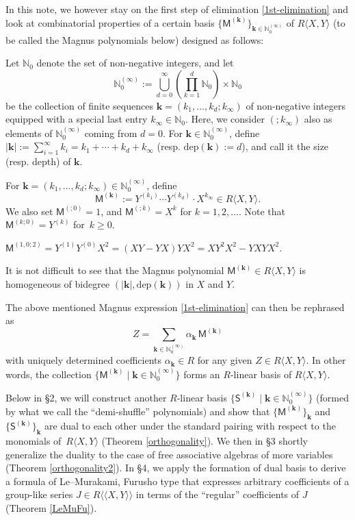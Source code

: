\documentclass[ALCO,Unicode,published]{cedram}
\def\bk{{\mathbf{k}}}
\def\MM{{\mathsf{M}}}
\def\SS{{\mathsf{S}}}
\def\dep{\mathrm{dep}}
\def\N{{\mathbb N}}
\def\la{\langle}
\def\ra{\rangle}
\def\lala{\la\!\la}
\def\rara{\ra\!\ra}
\begin{document}
In this note, we however stay on the first step of elimination 
\eqref{1st-elimination} and 
look at combinatorial properties of a certain basis 
$\{\MM^{(\bk)}\}_{\bk\in \N_0^{(\infty)}}$ of $R\la X,Y\ra$
(to be called the Magnus polynomials below)
designed as follows: 

\begin{Notation} 
Let $\N_0$ denote the set of non-negative integers, and 
let 
$$
\N_0^{(\infty)}:=\bigcup_{d=0}^\infty
\left(
\prod_{k=1}^{d}\N_0\right)
\times \N_0 
$$ 
be the collection of finite sequences 
$
\bk=(k_1,\dots,k_d; k_\infty)
$
of non-negative integers equipped 
with a special last entry $k_\infty\in \N_0$. 
Here, we consider $(;k_\infty)$ also as elements of 
$\N_0^{(\infty)}$ coming from $d=0$.
For $\bk\in \N_0^{(\infty)}$, define
$|\bk|:=\sum_{i=1}^\infty k_i=k_1+\cdots+k_d+k_\infty$ 
(resp. $\dep(\bk):=d$),
and call it the size (resp. depth) of $\bk$.
\end{Notation}

\begin{Definition}
\label{defMagnus}
For $\bk=(k_1,\dots,k_d; k_\infty)\in\N_0^{(\infty)}$, define
$$
\MM^{(\bk)}:=Y^{(k_1)}\cdots Y^{(k_d)} \cdot X^{k_\infty} \in R\la X,Y\ra.
$$
We also set $\MM^{(;0)}=1$, and $\MM^{(;k)}=X^k$ for $k=1,2,\dots$.
Note that $\MM^{(k;0)}=Y^{(k)}$ for~$k\ge 0$.
\end{Definition}

\begin{Example} 
$\MM^{(1,0;2)}=Y^{(1)}Y^{(0)}X^2=(XY-YX)YX^2=XY^2X^2-YXYX^2$.
\end{Example}

It is not difficult to see that the Magnus polynomial $\MM^{(\bk)}\in R\la X,Y\ra$ 
is homogeneous
of bidegree $(|\bk|,\dep(\bk))$ in $X$ and $Y$.

The above mentioned Magnus expression \eqref{1st-elimination}
can then be rephrased as
\begin{equation} \label{Magnus}
Z=\sum_{\bk\in \N_0^{(\infty)}}
\alpha_{\bk}\, \MM^{(\bk)}
\end{equation}
with uniquely determined coefficients $\alpha_{\bk}\in R$ for any given 
$Z\in R\la X,Y\ra$.
In other words, the collection $\{\MM^{(\bk)}\mid \bk\in  \N_0^{(\infty)}\}$ 
forms an $R$-linear basis of $R\la X,Y\ra$.

Below in \S 2, we will construct another $R$-linear basis 
$\{\SS^{(\bk)}\mid \bk\in  \N_0^{(\infty)}\}$
(formed by what we call the ``demi-shuffle'' polynomials)
and show that 
$\{\MM^{(\bk)}\}_\bk$
and $\{\SS^{(\bk)}\}_\bk$
are dual to each other under the standard pairing
with respect to the monomials of~$R\la X,Y\ra$
(Theorem \ref{orthogonality}).
We then in \S 3 shortly generalize the duality to the case of
free associative algebras of more variables (Theorem 
\ref{orthogonality2}). 
In \S 4, we apply the formation of dual basis 
to derive a formula of Le--Murakami, Furusho type 
that expresses arbitrary coefficients of a group-like series 
$J\in R\lala X,Y\rara$ in terms of 
the ``regular'' coefficients of $J$
(Theorem \ref{LeMuFu}).  
\end{document}
